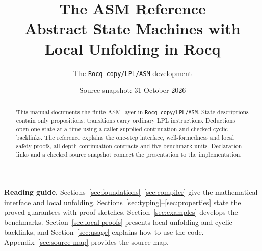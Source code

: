 \documentclass[10pt,a4paper]{article}
\title{\bfseries The ASM Reference\\[0.4em]
  \large Abstract State Machines with Local Unfolding in Rocq}
\author{The \texttt{Rocq-copy/LPL/ASM} development}
\date{Source snapshot: 31 October 2026}
\begin{document}
\maketitle
\thispagestyle{empty}
\begin{abstract}
This manual documents the finite ASM layer in
\nolinkurl{Rocq-copy/LPL/ASM}. State descriptions contain only propositions;
transitions carry ordinary LPL instructions. Deductions open one state at a
time using a caller-supplied continuation and checked cyclic backlinks.
The reference explains the one-step interface, well-formedness and local
safety proofs, all-depth continuation contracts and five benchmark units.
Declaration links and a checked source snapshot connect the presentation
to the implementation.
\end{abstract}
\vfill
\textbf{Reading guide.}
Sections~\ref{sec:foundations}--\ref{sec:compiler} give the mathematical
interface and local unfolding. Sections~\ref{sec:typing}--\ref{sec:properties}
state the proved guarantees with proof sketches.
Section~\ref{sec:examples} develops the benchmarks.
Section~\ref{sec:local-proofs} presents local unfolding and cyclic backlinks, and
Section~\ref{sec:usage} explains how to use the code.
Appendix~\ref{sec:source-map} provides the source map.
\clearpage
\tableofcontents
\clearpage









\appendix

\end{document}
